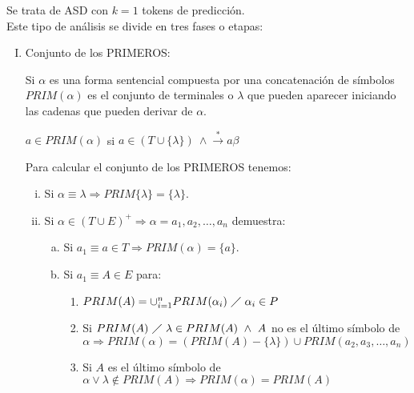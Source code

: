  Se trata de ASD con $k=1$ tokens de predicción.
\\

Este tipo de análisis se divide en tres fases o etapas:

\begin{enumerate}[I.]

\item Conjunto de los PRIMEROS: {

 Si $\alpha$ es una forma sentencial compuesta por una concatenaci\'on de
s\'imbolos $PRIM(\alpha)$ es el conjunto de terminales o $\lambda$ que pueden
aparecer iniciando las cadenas que pueden derivar de $\alpha$.


\form $a \in PRIM(\alpha)$ si $a \in (T \cup \{\lambda\})\ \wedge \stackrel{*}{\longrightarrow} a\beta$

\regl Para calcular el conjunto de los PRIMEROS tenemos:

\begin{enumerate}[i.]

\item Si $\alpha \equiv \lambda \Rightarrow PRIM\{\lambda\} = \{\lambda\}$.

\item Si $\alpha \in (T \cup E)^+ \Rightarrow \alpha = a_1, a_2, \ldots, a_n$ demuestra:
 
\begin{enumerate}[a.]

\item Si $a_1 \equiv a \in T \Rightarrow PRIM(\alpha) = \{a\}$.  

\item Si $a_1 \equiv A \in E$ para:

\begin{enumerate}[1.]

\item $PRIM(A) = \cup^n_{i=1} PRIM(\alpha_i)\ \diagup\ \alpha_i \in P$

\item Si $PRIM(A)\ \diagup\ \lambda \in PRIM(A)\ \wedge\ A$ no es el último símbolo de $\alpha \Rightarrow PRIM(\alpha) = (PRIM(A)-\{\lambda\}) \cup PRIM (a_2, a_3, \ldots, a_n)$

\item Si $A$ es el último símbolo de $\alpha \vee \lambda \notin PRIM(A) \Rightarrow PRIM(\alpha) = PRIM(A)$

\end{enumerate}


\end{enumerate}



\end{enumerate}}
\end{enumerate}
